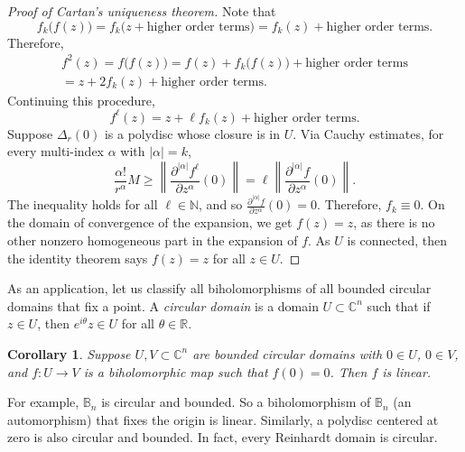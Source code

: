 \documentclass[12pt,openany]{book}
\newcommand{\sabs}[1]{\lvert {#1} \rvert}
\newcommand{\norm}[1]{\left\lVert {#1} \right\rVert}
\newcommand{\C}{{\mathbb{C}}}
\newcommand{\R}{{\mathbb{R}}}
\newcommand{\N}{{\mathbb{N}}}
\newcommand{\bB}{{\mathbb{B}}}
\newcommand{\myindex}[1]{#1\index{#1}}
\theoremstyle{plain}
\newtheorem{cor}[thm]{Corollary}
\theoremstyle{remark}
\theoremstyle{definition}
\theoremstyle{exercise}
\theoremstyle{example}
\begin{document}
\begin{proof}[Proof of Cartan's uniqueness theorem]
Note that
\begin{equation*}
f_k\bigl(f(z)\bigr)
=
f_k\bigl(z + \text{higher order terms}\bigr)
=
f_k(z) + \text{higher order terms}.
\end{equation*}
Therefore,
\begin{multline*}
f^2(z) =
f\bigl(f(z)\bigr) =
f(z) + f_k\bigl(f(z)\bigr) + \text{higher order terms}
\\
=
z + 2 f_k(z) + \text{higher order terms}.
\end{multline*}
Continuing this procedure,
\begin{equation*}
f^\ell(z) = z + \ell f_k(z) + \text{higher order terms}.
\end{equation*}
Suppose $\Delta_r(0)$ is a polydisc whose
closure is in $U$.
Via Cauchy estimates,
for every multi-index $\alpha$ with $\sabs{\alpha}=k$,
\begin{equation*}
\frac{\alpha!}{r^\alpha} M
\geq
\norm{\frac{\partial^{\sabs{\alpha}} f^\ell}{\partial z^\alpha}(0)}
=
\ell
\norm{\frac{\partial^{\sabs{\alpha}} f}{\partial z^\alpha}(0)} .
\end{equation*}
The inequality holds for all $\ell \in \N$, and so
$\frac{\partial^{\sabs{\alpha}} f}{\partial z^\alpha}(0) = 0$.  Therefore,
$f_k \equiv 0$.  On the domain of convergence of the expansion,
we get $f(z) = z$, as there is no other
nonzero homogeneous part in the expansion of $f$.  As $U$ is connected,
then the identity theorem says $f(z) = z$ for all $z \in U$.
\end{proof}

As an application, let us classify all biholomorphisms of all bounded
circular domains that fix a point.
A \emph{\myindex{circular domain}} is a domain
$U \subset \C^n$ such that if $z \in U$, then $e^{i\theta} z \in U$ for
all $\theta \in \R$.

\begin{cor}
Suppose $U, V \subset \C^n$ are bounded circular domains with $0 \in U$, $0 \in
V$, and $f \colon U \to V$ is
a biholomorphic map such that $f(0) = 0$.  Then $f$ is linear.
\end{cor}

For example, $\bB_n$ is circular and bounded.  So a biholomorphism of $\bB_n$
(an automorphism)
that fixes the origin is linear.  Similarly, a polydisc centered at zero is
also circular and bounded.  In fact, every Reinhardt domain is circular.
\end{document}
